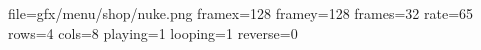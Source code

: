 file=gfx/menu/shop/nuke.png
framex=128
framey=128
frames=32
rate=65
rows=4
cols=8
playing=1
looping=1
reverse=0

